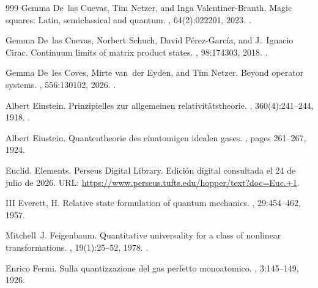 \begin{thebibliography}{999}
Gemma De~las Cuevas, Tim Netzer, and Inga Valentiner-Branth.
\newblock Magic squares: Latin, semiclassical and quantum.
, 64(2):022201, 2023.
\newblock \href {https://doi.org/10.1063/5.0127393}
  {}.

Gemma De~las Cuevas, Norbert Schuch, David P{\'e}rez-Garc{\'i}a, and J.~Ignacio
  Cirac.
\newblock Continuum limits of matrix product states.
, 98:174303, 2018.
\newblock \href {https://doi.org/10.1103/PhysRevB.98.174303}
  {}.

Gemma De~les Coves, Mirte van~der Eyden, and Tim Netzer.
\newblock Beyond operator systems.
, 556:130102,
  2026.
\newblock \href {https://doi.org/10.1016/j.jmaa.2025.130102}
  {}.

Albert Einstein.
\newblock Prinzipielles zur allgemeinen relativitätstheorie.
, 360(4):241--244, 1918.
\newblock \href {https://doi.org/10.1002/andp.19183600402}
  {}.

Albert Einstein.
\newblock Quantentheorie des einatomigen idealen gases.
,
  pages 261--267, 1924.

Euclid.
\newblock Elements.
\newblock Perseus Digital Library.
\newblock Edición digital consultada el 24 de julio de 2026.
\newblock URL: \url{https://www.perseus.tufts.edu/hopper/text?doc=Euc.+1}.

III Everett, H.
\newblock Relative state formulation of quantum mechanics.
, 29:454--462, 1957.

Mitchell~J. Feigenbaum.
\newblock Quantitative universality for a class of nonlinear transformations.
, 19(1):25--52, 1978.
\newblock \href {https://doi.org/10.1007/BF01020332}
  {}.

Enrico Fermi.
\newblock Sulla quantizzazione del gas perfetto monoatomico.
, 3:145--149, 1926.


\end{thebibliography}
